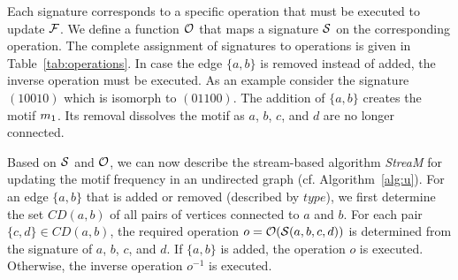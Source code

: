 \documentclass{article}
\begin{document}










Each signature corresponds to a specific operation that must be executed to update ${\cal F}$.
We define a function ${\cal O}$ that maps a signature ${\cal S}$ on the corresponding operation.
The complete assignment of signatures to operations is given in Table~\ref{tab:operations}.
In case the edge $\{a,b\}$ is removed instead of added, the inverse operation must be executed.
As an example consider the signature $(10010)$ which is isomorph to $(01100)$.
The addition of $\{a,b\}$ creates the motif $m_{1}$.
Its removal dissolves the motif as $a$, $b$, $c$, and $d$ are no longer connected.

Based on ${\cal S}$ and ${\cal O}$, we can now describe the stream-based algorithm \emph{StreaM} for updating the motif frequency in an undirected graph (cf. Algorithm~\ref{alg:u}).
For an edge $\{a,b\}$ that is added or removed (described by $type$), we first determine the set $CD(a,b)$ of all pairs of vertices connected to $a$ and $b$.
For each pair $\{c,d\} \in CD(a,b)$, the required operation $o = {\cal O}({\cal S}(a,b,c,d))$ is determined from the signature of $a$, $b$, $c$, and $d$.
If $\{a,b\}$ is added, the operation $o$ is executed.
Otherwise, the inverse operation $o^{-1}$ is executed.
\end{document}
